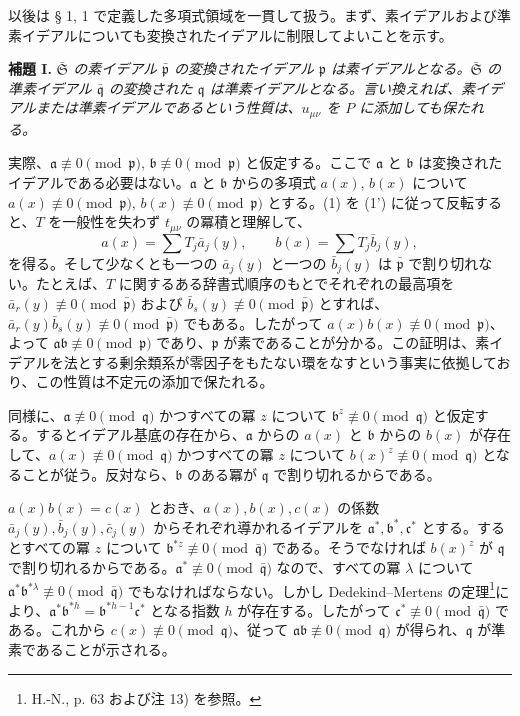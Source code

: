\documentclass[11pt]{article}
\providecommand{\frakS}{\mathfrak S}
\providecommand{\frakp}{\mathfrak p}
\providecommand{\frakq}{\mathfrak q}
\providecommand{\fraka}{\mathfrak a}
\providecommand{\frakb}{\mathfrak b}
\providecommand{\frakc}{\mathfrak c}
\providecommand{\frakp}{\mathfrak p}
\providecommand{\frakq}{\mathfrak q}
\begin{document}
以後は § 1, 1 で定義した多項式領域を一貫して扱う。まず、素イデアルおよび準素イデアルについても変換されたイデアルに制限してよいことを示す。

\textbf{補題 I.} \emph{$\bar{\frakS}$ の素イデアル $\bar{\frakp}$ の変換されたイデアル $\frakp$ は素イデアルとなる。$\bar{\frakS}$ の準素イデアル $\bar{\frakq}$ の変換された $\frakq$ は準素イデアルとなる。言い換えれば、素イデアルまたは準素イデアルであるという性質は、$u_{\mu\nu}$ を $P$ に添加しても保たれる。}

実際、$\fraka\not\equiv0\pmod{\frakp}$, $\frakb\not\equiv0\pmod{\frakp}$ と仮定する。ここで $\fraka$ と $\frakb$ は変換されたイデアルである必要はない。$\fraka$ と $\frakb$ からの多項式 $a(x)$, $b(x)$ について $a(x)\not\equiv0\pmod{\frakp}$, $b(x)\not\equiv0\pmod{\frakp}$ とする。(1) を (1') に従って反転すると、$T$ を一般性を失わず $t_{\mu\nu}$ の冪積と理解して、
\[
 a(x)=\sum T_j \bar a_j(y),\qquad b(x)=\sum T_j \bar b_j(y),
\]
を得る。そして少なくとも一つの $\bar a_j(y)$ と一つの $\bar b_j(y)$ は $\bar{\frakp}$ で割り切れない。たとえば、$T$ に関するある辞書式順序のもとでそれぞれの最高項を $\bar a_r(y)\not\equiv0\pmod{\bar{\frakp}}$ および $\bar b_s(y)\not\equiv0\pmod{\bar{\frakp}}$ とすれば、$\bar a_r(y)\bar b_s(y)\not\equiv0\pmod{\bar{\frakp}}$ でもある。したがって $a(x)b(x)\not\equiv0\pmod{\frakp}$、よって $\fraka\frakb\not\equiv0\pmod{\frakp}$ であり、$\frakp$ が素であることが分かる。この証明は、素イデアルを法とする剰余類系が零因子をもたない環をなすという事実に依拠しており、この性質は不定元の添加で保たれる。

同様に、$\fraka\not\equiv0\pmod{\frakq}$ かつすべての冪 $z$ について $\frakb^z\not\equiv0\pmod{\frakq}$ と仮定する。するとイデアル基底の存在から、$\fraka$ からの $a(x)$ と $\frakb$ からの $b(x)$ が存在して、$a(x)\not\equiv0\pmod{\frakq}$ かつすべての冪 $z$ について $b(x)^z\not\equiv0\pmod{\frakq}$ となることが従う。反対なら、$\frakb$ のある冪が $\frakq$ で割り切れるからである。

$a(x)b(x)=c(x)$ とおき、$a(x),b(x),c(x)$ の係数 $\bar a_j(y),\bar b_j(y),\bar c_j(y)$ からそれぞれ導かれるイデアルを $\fraka^*,\frakb^*,\frakc^*$ とする。するとすべての冪 $z$ について $\frakb^{*z}\not\equiv0\pmod{\bar{\frakq}}$ である。そうでなければ $b(x)^z$ が $\frakq$ で割り切れるからである。$\fraka^*\not\equiv0\pmod{\bar{\frakq}}$ なので、すべての冪 $\lambda$ について $\fraka^*\frakb^{*\lambda}\not\equiv0\pmod{\bar{\frakq}}$ でもなければならない。しかし Dedekind--Mertens の定理\footnote{H.-N., p. 63 および注 13) を参照。}により、$\fraka^*\frakb^{*h}=\frakb^{*h-1}\frakc^*$ となる指数 $h$ が存在する。したがって $\frakc^*\not\equiv0\pmod{\bar{\frakq}}$ である。これから $c(x)\not\equiv0\pmod{\frakq}$、従って $\fraka\frakb\not\equiv0\pmod{\frakq}$ が得られ、$\frakq$ が準素であることが示される。
\end{document}
